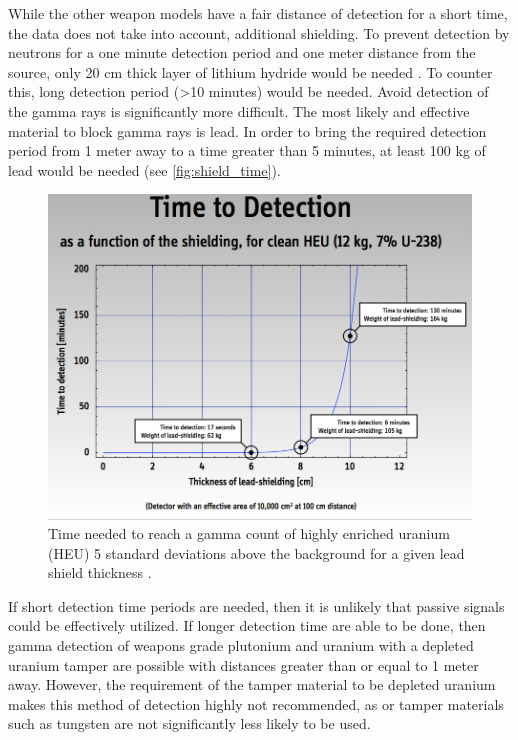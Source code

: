 \documentclass{report}
\begin{document}
While the other weapon models have a fair distance of detection for a short time, the data does not take into account, additional shielding. To prevent detection by neutrons for a one minute detection period and one meter distance from the source, only 20 cm thick layer of lithium hydride would be needed \cite{Fetter1990}. To counter this, long detection period (\textgreater 10 minutes) \cite{Fetter1990} would be needed. Avoid detection of the gamma rays is significantly more difficult. The most likely and effective material to block gamma rays is lead. In order to bring the required detection period from 1 meter away to a time greater than 5 minutes, at least 100 kg of lead would be needed (see \autoref{fig:shield_time}).


\begin{figure}[H]
 \centering
 \includegraphics[trim = 0cm 0.1cm 0cm 0cm, clip,scale=0.4]{./figures/shield_time.png}
   \caption{Time needed to reach a gamma count of highly enriched uranium (HEU) 5 standard deviations above the background for a given lead shield thickness \cite{Glaser2007}.}
     \label{fig:shield_time}
\end{figure}



If short detection time periods are needed, then it is unlikely that passive signals could be effectively utilized. If longer detection time are able to be done, then gamma detection of weapons grade plutonium and uranium with a depleted uranium tamper are possible with distances greater than or equal to 1 meter away. However, the requirement of the tamper material to be depleted uranium makes this method of detection highly not recommended, as or tamper materials such as tungsten are not significantly less likely to be used. 
\end{document}
